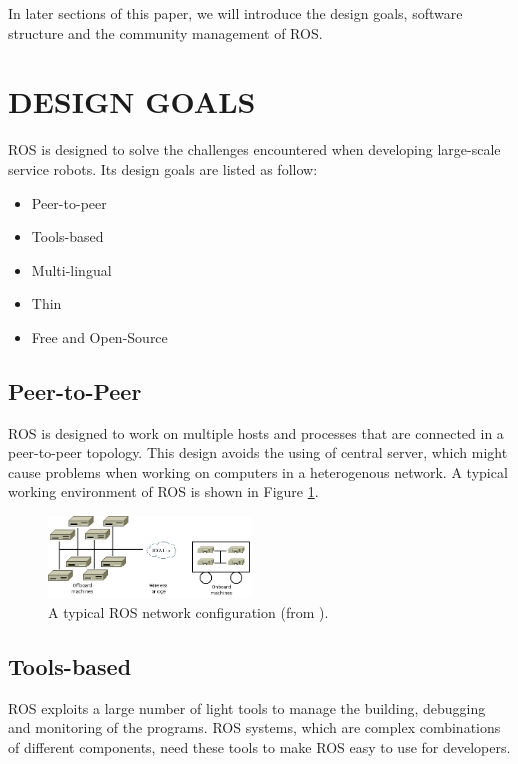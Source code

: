 \documentclass[a4paper, 10pt, conference]{ieeeconf}       %
\begin{document}
In later sections of this paper, we will introduce the design goals, software structure and the community management of ROS. 

\section{DESIGN GOALS}

ROS is designed to solve the challenges encountered when developing large-scale service robots\cite{quigley_ros:_2009}. Its design goals are listed as follow:
\begin{itemize}
  \item Peer-to-peer
  \item Tools-based
  \item Multi-lingual
  \item Thin
  \item Free and Open-Source
\end{itemize}

\subsection{Peer-to-Peer}

ROS is designed to work on multiple hosts and processes that are connected in a peer-to-peer topology. This design avoids the using of central server, which might cause problems when working on computers in a heterogenous network. A typical working environment of ROS is shown in Figure \ref{fig:network}.

\begin{figure}[htpb]
  \centering
  \includegraphics[width=0.48\textwidth]{network}
  \caption{A typical ROS network configuration (from \cite{quigley_ros:_2009}).}
  \label{fig:network}
\end{figure}

\subsection{Tools-based} 

ROS exploits a large number of light tools to manage the building, debugging and monitoring of the programs. ROS systems, which are complex combinations of different components, need these tools to make ROS easy to use for developers.
\end{document}
